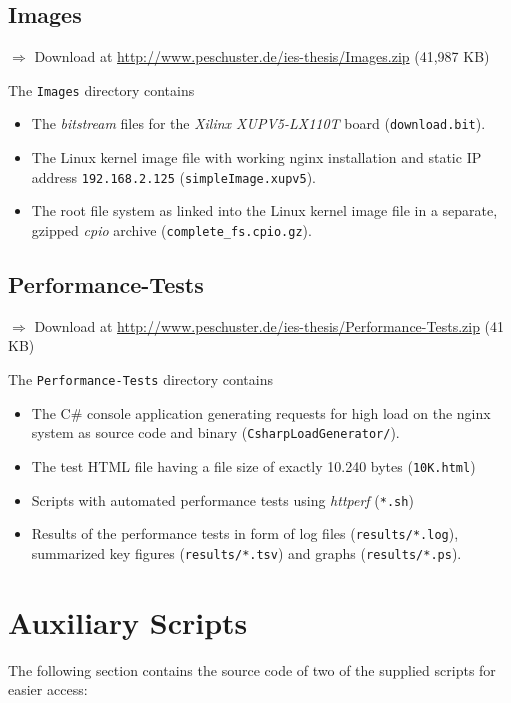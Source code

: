 \subsection{Images}
$\Rightarrow$ Download at \url{http://www.peschuster.de/ies-thesis/Images.zip} (41,987 KB)

The \texttt{Images} directory contains 

\begin{itemize}
  \setlength{\itemsep}{1pt}
  \setlength{\parskip}{2pt}
  \setlength{\parsep}{2pt}
\item The \textit{bitstream} files for the \textit{Xilinx XUPV5-LX110T} board (\texttt{download.bit}).
\item The Linux kernel image file with working nginx installation and static IP address \texttt{192.168.2.125} (\texttt{simpleImage.xupv5}).
\item The root file system as linked into the Linux kernel image file in a separate, gzipped \textit{cpio} archive (\texttt{complete\_fs.cpio.gz}).
\end{itemize}

\subsection{Performance-Tests}
$\Rightarrow$ Download at \url{http://www.peschuster.de/ies-thesis/Performance-Tests.zip} (41 KB)

The \texttt{Performance-Tests} directory contains 

\begin{itemize}
  \setlength{\itemsep}{1pt}
  \setlength{\parskip}{2pt}
  \setlength{\parsep}{2pt}
\item The C\# console application generating requests for high load on the nginx system as source code and binary (\texttt{CsharpLoadGenerator/}).
\item The test HTML file having a file size of exactly 10.240 bytes (\texttt{10K.html})
\item Scripts with automated performance tests using \textit{httperf} (\texttt{*.sh})
\item Results of the performance tests in form of log files (\texttt{results/*.log}), summarized key figures (\texttt{results/*.tsv}) and graphs (\texttt{results/*.ps}).
\end{itemize}

\section{Auxiliary Scripts}
The following section contains the source code of two of the supplied scripts for easier access:

